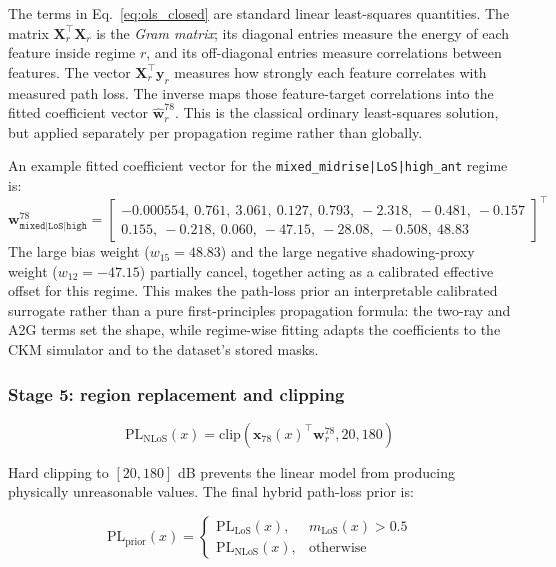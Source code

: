 The terms in Eq.~\eqref{eq:ols_closed} are standard linear least-squares
quantities. The matrix \(\textbf{X}_r^\top\textbf{X}_r\) is the
\emph{Gram matrix}; its diagonal entries measure the energy of each feature
inside regime \(r\), and its off-diagonal entries measure correlations between
features. The vector \(\textbf{X}_r^\top\textbf{y}_r\) measures how strongly
each feature correlates with measured path loss. The inverse maps those
feature-target correlations into the fitted coefficient vector
\(\hat{\textbf{w}}^{78}_{r}\). This is the classical ordinary least-squares
solution, but applied separately per propagation regime rather than globally.

An example fitted coefficient vector for the \texttt{mixed\_midrise|LoS|high\_ant}
regime is:
\[
\textbf{w}^{78}_{\texttt{mixed|LoS|high}}
=
\begin{bmatrix}
-0.000554,\ 0.761,\ 3.061,\ 0.127,\ 0.793,\ -2.318,\ -0.481,\ -0.157 \\[4pt]
0.155,\ -0.218,\ 0.060,\ -47.15,\ -28.08,\ -0.508,\ 48.83
\end{bmatrix}^\top
\]
The large bias weight ($w_{15} = 48.83$) and the large negative
shadowing-proxy weight ($w_{12} = -47.15$) partially cancel, together
acting as a calibrated effective offset for this regime.
This makes the path-loss prior an interpretable calibrated surrogate rather than a pure
first-principles propagation formula: the two-ray and A2G terms set the
shape, while regime-wise fitting adapts the coefficients to the CKM simulator
and to the dataset's stored masks.

\subsubsection{Stage 5: region replacement and clipping}

\begin{equation}
\mathrm{PL}_{\mathrm{NLoS}}(x)
=
\mathrm{clip}\!\left(
\textbf{x}_{78}(x)^\top \textbf{w}^{78}_{r},
20,
180
\right)
\label{eq:pl_nlos_final}
\end{equation}

Hard clipping to $[20, 180]$ dB prevents the linear model from producing
physically unreasonable values. The final hybrid path-loss prior is:

\begin{equation}
\mathrm{PL}_{\mathrm{prior}}(x)
=
\begin{cases}
\mathrm{PL}_{\mathrm{LoS}}(x), & m_{\mathrm{LoS}}(x) > 0.5 \\
\mathrm{PL}_{\mathrm{NLoS}}(x), & \text{otherwise}
\end{cases}
\label{eq:pl_hybrid}
\end{equation}

